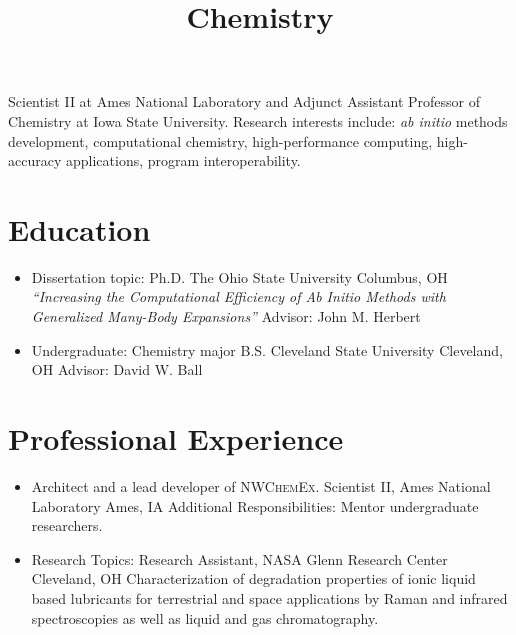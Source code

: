 \documentclass[11pt,a4paper,sans]{moderncv}
\title{Chemistry}
\begin{document}
\makecvtitle

\small{
	Scientist II at Ames National Laboratory and Adjunct Assistant
    Professor of Chemistry at Iowa State University.  Research interests
    include: \textit{ab initio} methods development, computational chemistry,
    high-performance computing, high-accuracy applications, program
    interoperability.
}


\section{Education}
\vspace{5pt}

\begin{itemize}
	\item{
		  {Dissertation topic:}
		  {Ph.D. The Ohio State University}
		  {Columbus, OH}
		  {}
		  {\textit{``Increasing the Computational Efficiency of Ab Initio
		  		 Methods with Generalized Many-Body Expansions''}}
 		  {Advisor:  John M. Herbert}
 		  {}}
	\item{
		  {Undergraduate: Chemistry major}
		  {B.S. Cleveland State University}
		  {Cleveland, OH}
		  {Advisor: David W. Ball}
		  {}}
\end{itemize}


\section{Professional Experience}
\vspace{5pt}
\begin{itemize}
	\item{
		  {Architect and a lead developer of \textsc{NWChemEx}.}
		  {Scientist II, Ames National Laboratory}
		  {Ames, IA}
		  {}
		  {Additional Responsibilities: Mentor undergraduate researchers.}}
	\item{
 		  {Research Topics:}
 		  {Research Assistant, NASA Glenn Research Center}
 		  {Cleveland, OH}
 		  {}
 		  {Characterization of degradation properties of ionic liquid based
 		   lubricants for terrestrial and space applications by Raman and
 		   infrared spectroscopies as well as liquid and gas chromatography.}
 	      {}}
\end{itemize}
\end{document}
